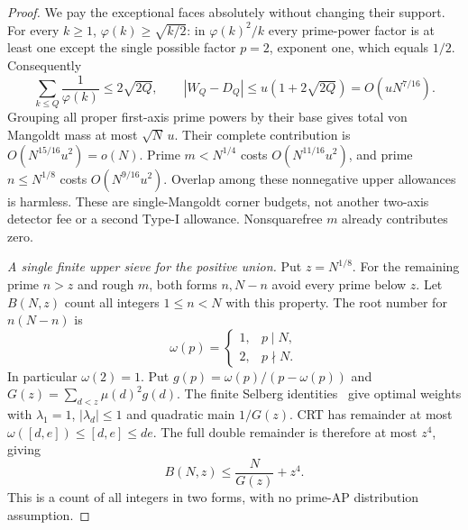 \documentclass[11pt,a4paper]{article}
\theoremstyle{definition}
\theoremstyle{remark}
\begin{document}
\begin{proof}
We pay the exceptional faces absolutely without changing their
support.  For every $k\geq1$,
$\varphi(k)\geq\sqrt{k/2}$: in $\varphi(k)^2/k$ every
prime-power factor is at least one except the single possible
factor $p=2$, exponent one, which equals $1/2$.
Consequently
\[
 \sum_{k\leq Q}\frac1{\varphi(k)}\leq2\sqrt{2Q},\qquad
 |W_Q-D_Q|\leq u(1+2\sqrt{2Q})=O(uN^{7/16}).
\]
Grouping all proper first-axis prime powers by their base gives
total von Mangoldt mass at most $\sqrt N\,u$.  Their complete
contribution is $O(N^{15/16}u^2)=o(N)$.  Prime $m<N^{1/4}$
costs $O(N^{11/16}u^2)$, and prime $n\leq N^{1/8}$ costs
$O(N^{9/16}u^2)$.  Overlap among these nonnegative upper
allowances is harmless.  These are single-Mangoldt corner
budgets, not another two-axis detector fee or a second Type-I
allowance.  Nonsquarefree $m$ already contributes zero.

\emph{A single finite upper sieve for the positive union.}
Put $z=N^{1/8}$.  For the remaining prime $n>z$ and rough $m$,
both forms $n,N-n$ avoid every prime below $z$.  Let $B(N,z)$
count all integers $1\leq n<N$ with this property.  The root
number for $n(N-n)$ is
\[
 \omega(p)=\begin{cases}1,&p\mid N,\\2,&p\nmid N.\end{cases}
\]
In particular $\omega(2)=1$.  Put
$g(p)=\omega(p)/(p-\omega(p))$ and
$G(z)=\sum_{d<z}\mu(d)^2g(d)$.
The finite Selberg identities~\cite[(9.28)--(9.33)]{Richert}
give optimal weights with $\lambda_1=1$, $|\lambda_d|\leq1$
and quadratic main $1/G(z)$.  CRT has remainder at most
$\omega([d,e])\leq[d,e]\leq de$.  The full double remainder
is therefore at most $z^4$, giving
\begin{equation}
                    B(N,z)\leq\frac N{G(z)}+z^4.
 \label{eq:sector-Selberg-finite}
\end{equation}
This is a count of all integers in two forms, with no prime-AP
distribution assumption.


\end{proof}
\end{document}

